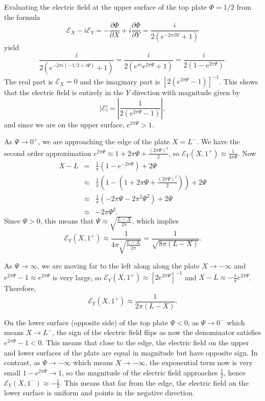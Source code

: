 \documentclass{article}
\newcommand{\pder}[2][]{\frac{\partial#1}{\partial#2}}
\begin{document}
Evaluating the electric field at the upper surface of the top plate \(\Phi = 1/2\) from the formula
\[ \mathcal{E}_X - i\mathcal{E}_Y = -\pder[\Phi]{X} + i\pder[\Phi]{Y} = \frac{i}{2(e^{-2\pi iW} + 1)} \]
yield
\[ \frac{i}{2(e^{-2\pi i(-1/2 + i\Psi)} + 1)} = \frac{i}{2(e^{\pi i}e^{2\pi \Psi} + 1)} = \frac{i}{2(1 - e^{2\pi \Psi})}. \]
The real part is \(\mathcal{E}_X = 0\) and the imaginary part is \([2(e^{2\pi \Psi} - 1)]^{-1}\). This shows that the electric field is entirely in the \(Y\) direction with magnitude given by
\[ |\mathcal{E}| = \left|\frac{1}{2(e^{2\pi \Psi} - 1)}\right|, \]
and since we are on the upper surface, \(e^{2\pi \Psi}  >  1\).

As \(\Psi \to 0^+\), we are approaching the edge of the plate \(X = L^-\). We have the second order approximation \(e^{2\pi \Psi} \approx 1 + 2\pi\Psi + \frac{(2\pi\Psi)^2}{2}\), so \(\mathcal{E}_Y(X, 1^+) \approx \frac{1}{4\pi\Psi}\). Now
\begin{eqnarray*}
    X - L & = & \frac{1}{\pi}(1 - e^{-2\pi\Psi}) + 2\Psi \\
          & \approx & \frac{1}{\pi}\left(1 - \left(1 + 2\pi\Psi + \frac{(2\pi\Psi)^2}{2}\right)\right) + 2\Psi \\
          & \approx & \frac{1}{\pi}\left(-2\pi\Psi - 2\pi^2\Psi^2\right) + 2\Psi \\
          & \approx & -2\pi\Psi^2.
\end{eqnarray*}
Since \(\Psi > 0\), this means that \(\Psi \approx \sqrt{\frac{L-X}{2\pi}}\), which implies
\[ \mathcal{E}_Y(X, 1^+) \approx \frac{1}{4\pi\sqrt{\frac{L-X}{2\pi}}} = \frac{1}{\sqrt{8\pi(L-X)}}. \]

As \(\Psi \to \infty\), we are moving far to the left along along the plate \(X \to -\infty\) and \(e^{2\pi\Psi} - 1 \approx e^{2\pi\Psi}\) is very large, so \(\mathcal{E}_Y(X, 1^+) \approx [2e^{2\pi\Psi}]^{-1}\) and \(X - L \approx -\frac{1}{\pi}e^{2\pi\Psi}\). Therefore,
\[ \mathcal{E}_Y(X, 1^+) \approx \frac{1}{2\pi(L-X)}. \]

On the lower surface (opposite side) of the top plate \(\Psi < 0\), as \(\Psi \to 0^-\) which means \(X \to L^-\), the sign of the electric field flips as now the denominator satisfies \(e^{2\pi\Psi} - 1 < 0\). This means that close to the edge, the electric field on the upper and lower surfaces of the plate are equal in magnitude but have opposite sign. In contrast, as \(\Psi \to -\infty\) which means \(X \to -\infty\), the exponential term now is very small \(1 - e^{2\pi \Psi} \to 1\), so the magnitude of the electric field approaches \(\frac{1}{2}\), hence \(\mathcal{E}_Y(X, 1^-) \approx -\frac{1}{2}\). This means that far from the edge, the electric field on the lower surface is uniform and points in the negative direction.
\end{document}

